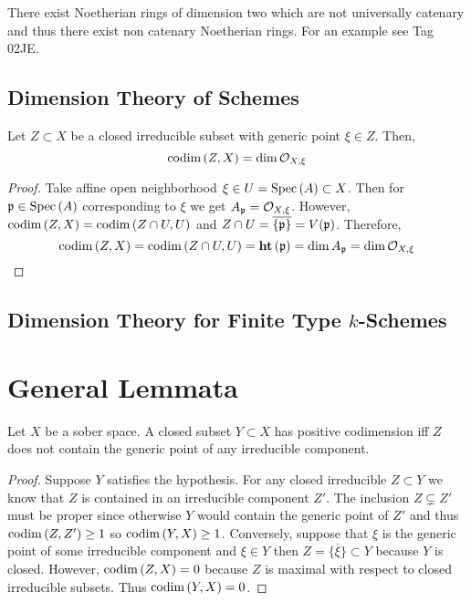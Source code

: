 \documentclass[12pt]{article}
\begin{document}
\begin{example}
There exist Noetherian rings of dimension two which are not universally catenary and thus there exist non catenary Noetherian rings. For an example see Tag 02JE.
\end{example}

\subsection{Dimension Theory of Schemes}

\begin{lemma} \label{codimension_loc_rings}
Let $Z \subset X$ be a closed irreducible subset with generic point $\xi \in Z$. Then,
\[ \mathrm{codim}\left( Z,X \right) = \dim{\mathcal{O}_{X, \xi}} \]
\end{lemma}


\begin{proof}
Take affine open neighborhood $\xi \in U = \mathrm{Spec}\left( A \right) \subset X$. Then for $\mathfrak{p} \in \mathrm{Spec}\left( A \right)$ corresponding to $\xi$ we get $A_{\mathfrak{p}} = \mathcal{O}_{X, \xi}$. However, $\mathrm{codim}\left( Z, X \right) = \mathrm{codim}\left( Z \cap U, U \right)$ and $Z \cap U = \overline{\{ \mathfrak{p} \}} = V(\mathfrak{p})$. Therefore,
\[ \mathrm{codim}\left( Z, X \right) = \mathrm{codim}\left( Z \cap U, U \right) = \mathbf{ht}\left( \mathfrak{p} \right) = \dim{A_{\mathfrak{p}}} = \dim{\mathcal{O}_{X, \xi}} \]
\end{proof}

\subsection{Dimension Theory for Finite Type $k$-Schemes}

\section{General Lemmata}

\begin{lemma}
Let $X$ be a sober space. A closed subset $Y \subset X$ has positive codimension iff $Z$ does not contain the generic point of any irreducible component.
\end{lemma}

\begin{proof}
Suppose $Y$ satisfies the hypothesis.
For any closed irreducible $Z \subset Y$ we know that $Z$ is contained in an irreducible component $Z'$. The inclusion $Z \subsetneq Z'$ must be proper since otherwise $Y$ would contain the generic point of $Z'$ and thus $\mathrm{codim}\left( Z, Z' \right) \ge 1$ so $\mathrm{codim}\left( Y, X \right) \ge 1$. Conversely, suppose that $\xi$ is the generic point of some irreducible component and $\xi \in Y$ then $Z = \overline{\{ \xi \} } \subset Y$ because $Y$ is closed. However, $\mathrm{codim}\left( Z, X \right) = 0$ because $Z$ is maximal with respect to closed irreducible subsets. Thus $\mathrm{codim}\left( Y, X \right) = 0$.
\end{proof}
\end{document}
